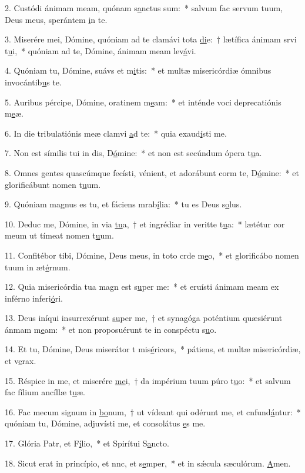 2. Custódi ánimam meam, quónam s\uline{a}nctus sum:~* salvum fac servum tuum, Deus meus, sperántem \uline{i}n te.\par 
3. Miserére mei, Dómine, quóniam ad te clamávi tota \uline{di}e:~† lætífica ánimam srvi t\uline{u}i,~* quóniam ad te, Dómine, ánimam meam lev\uline{á}vi.\par 
4. Quóniam tu, Dómine, suávs et m\uline{i}tis:~* et multæ misericórdiæ ómnibus invocántib\uline{u}s te.\par 
5. Auribus pércipe, Dómine, oratinem m\uline{e}am:~* et inténde voci deprecatiónis m\uline{e}æ.\par 
6. In die tribulatiónis meæ clamvi \uline{a}d te:~* quia exaud\uline{í}sti me.\par 
7. Non est símilis tui in dis, D\uline{ó}mine:~* et non est secúndum ópera t\uline{u}a.\par 
8. Omnes gentes quascúmque fecísti, vénient, et adorábunt corm te, D\uline{ó}mine:~* et glorificábunt nomen t\uline{u}um.\par 
9. Quóniam magnus es tu, et fáciens mrab\uline{í}lia:~* tu es Deus s\uline{o}lus.\par 
10. Deduc me, Dómine, in via \uline{tu}a,~† et ingrédiar in veritte t\uline{u}a:~* lætétur cor meum ut tímeat nomen t\uline{u}um.\par 
11. Confitébor tibi, Dómine, Deus meus, in toto crde m\uline{e}o,~* et glorificábo nomen tuum in æt\uline{é}rnum.\par 
12. Quia misericórdia tua magn est s\uline{u}per me:~* et eruísti ánimam meam ex inférno inferi\uline{ó}ri.\par 
13. Deus iníqui insurrexérunt \uline{su}per me,~† et synagóga poténtium quæsiérunt ánmam m\uline{e}am:~* et non proposuérunt te in conspéctu s\uline{u}o.\par 
14. Et tu, Dómine, Deus miserátor t mis\uline{é}ricors,~* pátiens, et multæ misericórdiæ, et v\uline{e}rax.\par 
15. Réspice in me, et miserére \uline{me}i,~† da impérium tuum púro t\uline{u}o:~* et salvum fac fílium ancíllæ t\uline{u}æ.\par 
16. Fac mecum signum in \uline{bo}num,~† ut vídeant qui odérunt me, et cnfund\uline{á}ntur:~* quóniam tu, Dómine, adjuvísti me, et consolátus \uline{e}s me.\par 
17. Glória Patr, et F\uline{í}lio,~* et Spirítui S\uline{a}ncto.\par 
18. Sicut erat in princípio, et nnc, et s\uline{e}mper,~* et in sǽcula sæculórum. \uline{A}men.\par 
